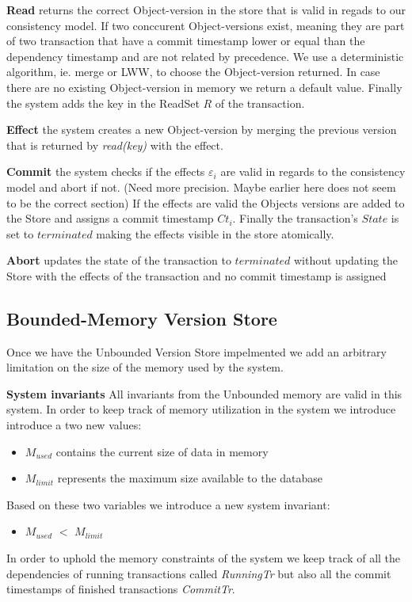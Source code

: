 \documentclass[systeme,french,english]{compas2022}
\begin{document}
\textbf{Read} returns the correct Object-version in the store that is valid in regads to our consistency model.
If two conccurent Object-versions exist, meaning they are part of two transaction that have a commit timestamp lower or equal than the dependency timestamp and are not related by precedence.
We use a deterministic algorithm, ie. merge or LWW, to choose the Object-version returned.
In case there are no existing Object-version in memory we return a default value.
Finally the system adds the key in the ReadSet $R$ of the transaction. 


\textbf{Effect} the system creates a new Object-version by merging the previous version that is returned by \emph{read(key)} with the effect.

\textbf{Commit} the system checks if the effects $\varepsilon_i$ are valid in regards to the consistency model and abort if not. (Need more precision. Maybe earlier here does not seem to be the correct section)
If the effects are valid the Objects versions are added to the Store and assigns a commit timestamp $Ct_i$.
Finally the transaction's $State$ is set to $terminated$ making the effects visible in the store atomically.

\textbf{Abort} updates the state of the transaction to $terminated$ without updating the Store with the effects of the transaction and no commit timestamp is assigned

\subsection{Bounded-Memory Version Store}

Once we have the Unbounded Version Store impelmented we add an arbitrary limitation on the size of the memory used by the system.

\textbf{System invariants}
All invariants from the Unbounded memory are valid in this system.
In order to keep track of memory utilization in the system we introduce introduce a two new values:
\begin{itemize}
  \item \emph{$M_{used}$} contains the current size of data in memory
  \item \emph{$M_{limit}$} represents the maximum size available to the database
\end{itemize}
Based on these two variables we introduce a new system invariant:
\begin{itemize}
  \item \emph{$M_{used}$} $<$ \emph{$M_{limit}$}
\end{itemize}
In order to uphold the memory constraints of the system we keep track of all the dependencies of running transactions called \emph{RunningTr} but also all the commit timestamps of finished transactions \emph{CommitTr}.
\end{document}

